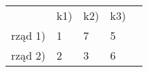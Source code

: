 \begin{tabular}{lllll}
   &     k1)& k2) & k3) \\
rząd 1) & 1 & 7 & 5 &    \\
rząd 2) & 2 & 3 & 6 &    \\
\end{tabular}